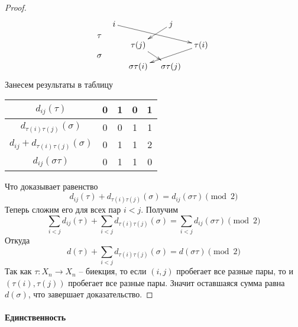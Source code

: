 \begin{proof}
\begin{align*}
{\begin{matrix}
{\tau}\\{}\\{\sigma}
\end{matrix}\quad
\begin{aligned}
\xymatrix@R=10pt@C=10pt{
	{i}\ar[drrr]&{}&{j}\ar[dl]&{}\\
	{}&{\tau(j)}\ar[dr]&{}&{\tau(i)}\ar[dll]\\
	{}&{\sigma\tau(i)}&{\sigma\tau(j)}&{}\\
}
\end{aligned}
}\\
\end{align*}
Занесем результаты в таблицу
\begin{center}
\begin{tabular}{|c|c|c|c|c|}
\hline
{$d_{ij}(\tau)$}&{0}&{1}&{0}&{1}\\
\hline
{$d_{\tau(i)\tau(j)}(\sigma)$}&{0}&{0}&{1}&{1}\\
\hline
{$d_{ij} + d_{\tau(i)\tau(j)}(\sigma)$}&{0}&{1}&{1}&{2}\\
\hline
{$d_{ij}(\sigma\tau)$}&{0}&{1}&{1}&{0}\\
\hline
\end{tabular}
\end{center}
Что доказывает равенство
\[
d_{ij}(\tau) + d_{\tau(i)\tau(j)}(\sigma) = d_{ij}(\sigma \tau) \pmod 2
\]
Теперь сложим его для всех пар $i < j$.
Получим
\[
\sum_{i<j}d_{ij}(\tau) + \sum_{i<j}d_{\tau(i)\tau(j)}(\sigma) = \sum_{i<j}d_{ij}(\sigma \tau) \pmod 2
\]
Откуда
\[
d(\tau) + \sum_{i<j}d_{\tau(i)\tau(j)}(\sigma) = d(\sigma \tau) \pmod 2
\]
Так как $\tau\colon X_n\to X_n$ -- биекция, то если $(i,j)$ пробегает все разные пары, то и $(\tau(i),\tau(j))$ пробегает все разные пары.
Значит оставшаяся сумма равна $d(\sigma)$, что завершает доказательство.
\end{proof}


\paragraph{Единственность}

